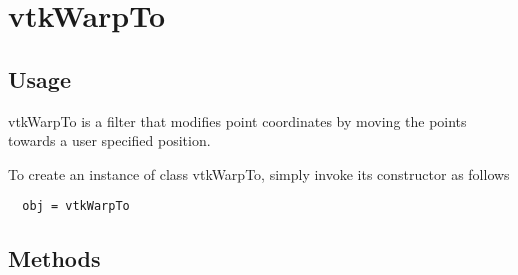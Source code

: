 \section{vtkWarpTo}

\subsection{Usage}

 vtkWarpTo is a filter that modifies point coordinates by moving the
 points towards a user specified position.

To create an instance of class vtkWarpTo, simply
invoke its constructor as follows
\begin{verbatim}
  obj = vtkWarpTo
\end{verbatim}
\subsection{Methods}

